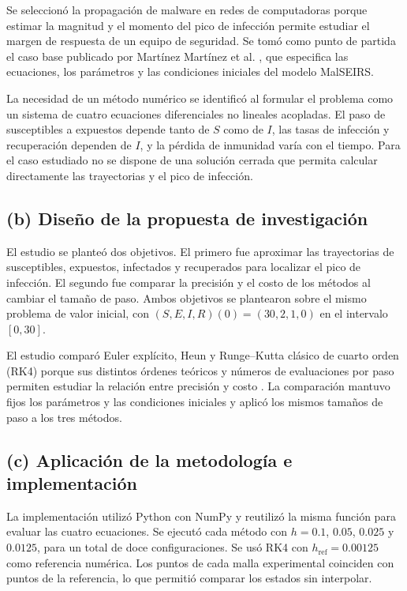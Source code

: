 \documentclass[11pt,a4paper]{article}
\begin{document}
Se seleccionó la propagación de malware en redes de computadoras porque estimar la magnitud y el momento del pico de infección permite estudiar el margen de respuesta de un equipo de seguridad. Se tomó como punto de partida el caso base publicado por Martínez Martínez et al. \cite{martinez2021}, que especifica las ecuaciones, los parámetros y las condiciones iniciales del modelo MalSEIRS.

La necesidad de un método numérico se identificó al formular el problema como un sistema de cuatro ecuaciones diferenciales no lineales acopladas. El paso de susceptibles a expuestos depende tanto de $S$ como de $I$, las tasas de infección y recuperación dependen de $I$, y la pérdida de inmunidad varía con el tiempo. Para el caso estudiado no se dispone de una solución cerrada que permita calcular directamente las trayectorias y el pico de infección.

\subsection*{(b) Diseño de la propuesta de investigación}

El estudio se planteó dos objetivos. El primero fue aproximar las trayectorias de susceptibles, expuestos, infectados y recuperados para localizar el pico de infección. El segundo fue comparar la precisión y el costo de los métodos al cambiar el tamaño de paso. Ambos objetivos se plantearon sobre el mismo problema de valor inicial, con $(S,E,I,R)(0)=(30,2,1,0)$ en el intervalo $[0,30]$.

El estudio comparó Euler explícito, Heun y Runge--Kutta clásico de cuarto orden (RK4) porque sus distintos órdenes teóricos y números de evaluaciones por paso permiten estudiar la relación entre precisión y costo \cite{metodos_ode}. La comparación mantuvo fijos los parámetros y las condiciones iniciales y aplicó los mismos tamaños de paso a los tres métodos.

\subsection*{(c) Aplicación de la metodología e implementación}

La implementación utilizó Python con NumPy y reutilizó la misma función para evaluar las cuatro ecuaciones. Se ejecutó cada método con $h=0.1$, $0.05$, $0.025$ y $0.0125$, para un total de doce configuraciones. Se usó RK4 con $h_{\mathrm{ref}}=0.00125$ como referencia numérica. Los puntos de cada malla experimental coinciden con puntos de la referencia, lo que permitió comparar los estados sin interpolar.
\end{document}
